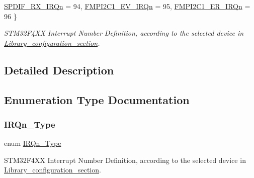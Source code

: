 \begin{DoxyCompactItemize}
\mbox{\hyperlink{group___peripheral__interrupt__number__definition_gga7e1129cd8a196f4284d41db3e82ad5c8a196c40800f5aff0af71e5fc9d7ff11b9}{S\+P\+D\+I\+F\+\_\+\+R\+X\+\_\+\+I\+R\+Qn}} = 94, 
\newline
\mbox{\hyperlink{group___peripheral__interrupt__number__definition_gga7e1129cd8a196f4284d41db3e82ad5c8ae9ea903d536521f9b94e5d0d538ca501}{F\+M\+P\+I2\+C1\+\_\+\+E\+V\+\_\+\+I\+R\+Qn}} = 95, 
\mbox{\hyperlink{group___peripheral__interrupt__number__definition_gga7e1129cd8a196f4284d41db3e82ad5c8a7864e18739e921e82f8b0e18cdafe2c0}{F\+M\+P\+I2\+C1\+\_\+\+E\+R\+\_\+\+I\+R\+Qn}} = 96
 \}
\begin{DoxyCompactList}\small\item\em S\+T\+M32\+F4\+XX Interrupt Number Definition, according to the selected device in \mbox{\hyperlink{group___library__configuration__section}{Library\+\_\+configuration\+\_\+section}}. \end{DoxyCompactList}\end{DoxyCompactItemize}


\subsection{Detailed Description}


\subsection{Enumeration Type Documentation}
\mbox{\label{group___peripheral__interrupt__number__definition_ga7e1129cd8a196f4284d41db3e82ad5c8}} 
\subsubsection{\texorpdfstring{I\+R\+Qn\+\_\+\+Type}{IRQn\_Type}}
{\footnotesize\ttfamily enum \mbox{\hyperlink{group___peripheral__interrupt__number__definition_ga7e1129cd8a196f4284d41db3e82ad5c8}{I\+R\+Qn\+\_\+\+Type}}}



S\+T\+M32\+F4\+XX Interrupt Number Definition, according to the selected device in \mbox{\hyperlink{group___library__configuration__section}{Library\+\_\+configuration\+\_\+section}}. 

